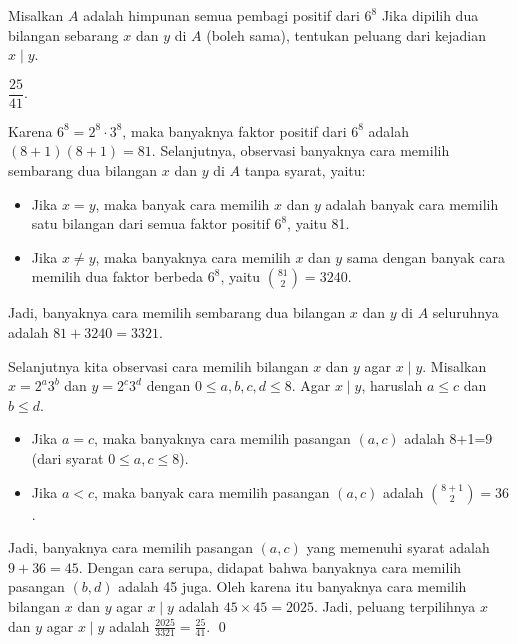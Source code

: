 \documentclass[12pt]{scrartcl}
\begin{document}
	\begin{soalbaru}
		Misalkan $A$ adalah himpunan semua pembagi positif dari $6^8$ Jika dipilih dua bilangan sebarang $x$ dan $y$ di $A$ (boleh sama), tentukan peluang dari kejadian $x \mid y$. 
		
		\begin{jawaban}
			$\dfrac{25}{41}$.
		\end{jawaban}
		\begin{solusi}
		Karena $6^8 = 2^8 \cdot 3^8$, maka banyaknya faktor positif dari $6^8$ adalah $(8+1)(8+1)=81$. Selanjutnya, observasi banyaknya cara memilih sembarang dua bilangan $x$ dan $y$ di $A$ tanpa syarat, yaitu:
		\begin{itemize}
		\item Jika $x=y$, maka banyak cara memilih $x$ dan $y$ adalah banyak cara memilih satu bilangan dari semua faktor positif $6^8$, yaitu 81.
		
		\item Jika $x\neq y$, maka banyaknya cara memilih $x$ dan $y$ sama dengan banyak cara memilih dua faktor berbeda $6^8$, yaitu $81 \choose 2$$= 3240$.
		\end{itemize}
		
		Jadi, banyaknya cara memilih sembarang dua bilangan $x$ dan $y$ di $A$ seluruhnya adalah $81+3240=3321$.
		
		Selanjutnya kita observasi cara memilih bilangan $x$ dan $y$ agar $x \mid y$. Misalkan $x=2^a3^b$ dan $y=2^c3^d$ dengan $0 \le a,b,c,d \le 8$. Agar $x \mid y$, haruslah $a \le c$ dan $b \le d$.
		\begin{itemize}
		\item Jika $a=c$, maka banyaknya cara memilih pasangan $(a,c)$ adalah 8+1=9 (dari syarat $0 \le a,c \le 8$).
		
		\item Jika $a < c$, maka banyak cara memilih pasangan $(a,c)$ adalah ${8+1 \choose 2} = 36$.
		\end{itemize}
		
		Jadi, banyaknya cara memilih pasangan $(a,c)$ yang memenuhi syarat adalah $9+36=45$. Dengan cara serupa, didapat bahwa banyaknya cara memilih pasangan $(b,d)$ adalah 45 juga. Oleh karena itu banyaknya cara memilih bilangan $x$ dan $y$ agar $x \mid y$ adalah $45 \times 45 = 2025$. Jadi, peluang terpilihnya $x$ dan $y$ agar $x \mid y$ adalah $\frac{2025}{3321}=\frac{25}{41}$. \qed
		\end{solusi}
	\end{soalbaru}
	
\end{document}
